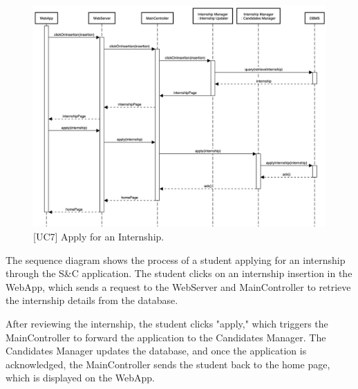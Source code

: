 \newpage

\begin{figure}[htbp]
    \centering
    \includegraphics[width=\linewidth]{DD/Images/sequenceDiagrams/apply.png}
    \caption{[UC7] Apply for an Internship.}
    \label{fig:applyInternship_immagine}
\end{figure}

The sequence diagram shows the process of a student applying for an internship through the S\&C application. The student clicks on an internship insertion in the WebApp, which sends a request to the WebServer and MainController to retrieve the internship details from the database. 

After reviewing the internship, the student clicks "apply," which triggers the MainController to forward the application to the Candidates Manager. The Candidates Manager updates the database, and once the application is acknowledged, the MainController sends the student back to the home page, which is displayed on the WebApp.

